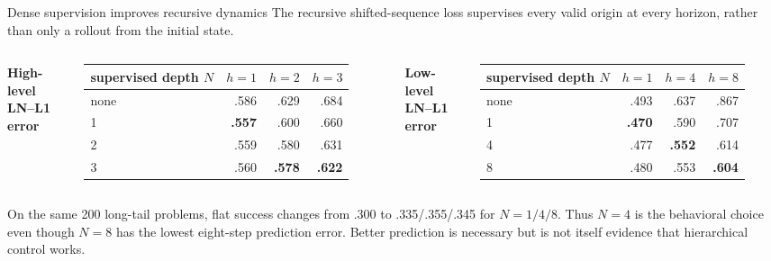 \documentclass[aspectratio=169,10pt]{beamer}
\newcommand{\good}[1]{\textcolor{cgreen}{\textbf{#1}}}
\begin{document}
\begin{frame}{Dense supervision improves recursive dynamics}
\small
The recursive shifted-sequence loss supervises every valid origin at every
horizon, rather than only a rollout from the initial state.

\medskip
\begin{columns}[T,onlytextwidth]
\centering
\textbf{High-level LN--L1 error}\par
\begin{tabular}{lrrr}
\toprule
supervised depth $N$ & $h=1$ & $h=2$ & $h=3$\\
\midrule
none & .586 & .629 & .684\\
1 & \good{.557} & .600 & .660\\
2 & .559 & .580 & .631\\
3 & .560 & \good{.578} & \good{.622}\\
\bottomrule
\end{tabular}

\centering
\textbf{Low-level LN--L1 error}\par
\begin{tabular}{lrrr}
\toprule
supervised depth $N$ & $h=1$ & $h=4$ & $h=8$\\
\midrule
none & .493 & .637 & .867\\
1 & \good{.470} & .590 & .707\\
4 & .477 & \good{.552} & .614\\
8 & .480 & .553 & \good{.604}\\
\bottomrule
\end{tabular}
\end{columns}

\medskip
On the same 200 long-tail problems, flat success changes from .300 to
.335/.355/.345 for $N=1/4/8$. Thus $N=4$ is the behavioral choice even though
$N=8$ has the lowest eight-step prediction error. Better prediction is
necessary but is not itself evidence that hierarchical control works.
\end{frame}
\end{document}

